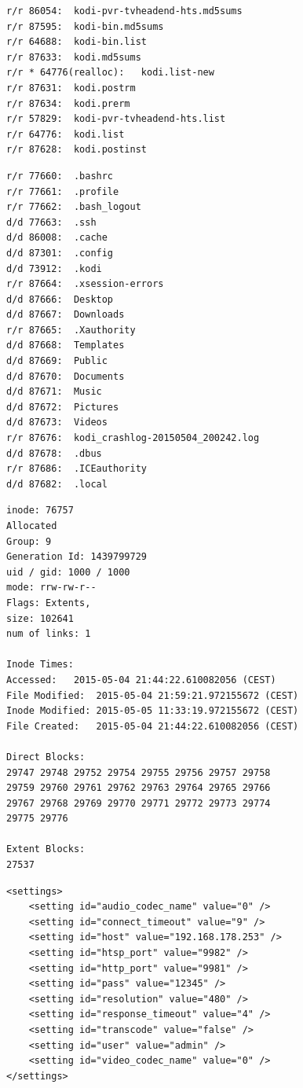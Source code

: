 \begin{cmd}[H]
\begin{verbatim}
r/r 86054:	kodi-pvr-tvheadend-hts.md5sums
r/r 87595:	kodi-bin.md5sums
r/r 64688:	kodi-bin.list
r/r 87633:	kodi.md5sums
r/r * 64776(realloc):	kodi.list-new
r/r 87631:	kodi.postrm
r/r 87634:	kodi.prerm
r/r 57829:	kodi-pvr-tvheadend-hts.list
r/r 64776:	kodi.list
r/r 87628:	kodi.postinst
\end{verbatim}
\caption{fls -o 2048 kodi.raw 55683 | grep kodi}
\label{cmd:kodi-dpkgkodi}
\end{cmd}

\begin{cmd}[H]
\begin{verbatim}
r/r 77660:	.bashrc
r/r 77661:	.profile
r/r 77662:	.bash_logout
d/d 77663:	.ssh
d/d 86008:	.cache
d/d 87301:	.config
d/d 73912:	.kodi
r/r 87664:	.xsession-errors
d/d 87666:	Desktop
d/d 87667:	Downloads
r/r 87665:	.Xauthority
d/d 87668:	Templates
d/d 87669:	Public
d/d 87670:	Documents
d/d 87671:	Music
d/d 87672:	Pictures
d/d 87673:	Videos
r/r 87676:	kodi_crashlog-20150504_200242.log
d/d 87678:	.dbus
r/r 87686:	.ICEauthority
d/d 87682:	.local
\end{verbatim}
\caption{fls -o 2048 kodi.raw 77659}
\label{cmd:kodi-homedir}
\end{cmd}

\begin{cmd}[H]
\begin{verbatim}
inode: 76757
Allocated
Group: 9
Generation Id: 1439799729
uid / gid: 1000 / 1000
mode: rrw-rw-r--
Flags: Extents,
size: 102641
num of links: 1

Inode Times:
Accessed:	2015-05-04 21:44:22.610082056 (CEST)
File Modified:	2015-05-04 21:59:21.972155672 (CEST)
Inode Modified:	2015-05-05 11:33:19.972155672 (CEST)
File Created:	2015-05-04 21:44:22.610082056 (CEST)

Direct Blocks:
29747 29748 29752 29754 29755 29756 29757 29758
29759 29760 29761 29762 29763 29764 29765 29766
29767 29768 29769 29770 29771 29772 29773 29774
29775 29776

Extent Blocks:
27537
\end{verbatim}
\caption{istat -o 2048 kodi.raw 76757}
\label{cmd:kodi-logfileaccess}
\end{cmd}

\begin{cmd}[H]
\begin{verbatim}
<settings>
    <setting id="audio_codec_name" value="0" />
    <setting id="connect_timeout" value="9" />
    <setting id="host" value="192.168.178.253" />
    <setting id="htsp_port" value="9982" />
    <setting id="http_port" value="9981" />
    <setting id="pass" value="12345" />
    <setting id="resolution" value="480" />
    <setting id="response_timeout" value="4" />
    <setting id="transcode" value="false" />
    <setting id="user" value="admin" />
    <setting id="video_codec_name" value="0" />
</settings>
\end{verbatim}
\caption{icat -o 2048 kodi.raw 76754}
\label{cmd:kodi-tvheadend}
\end{cmd}

